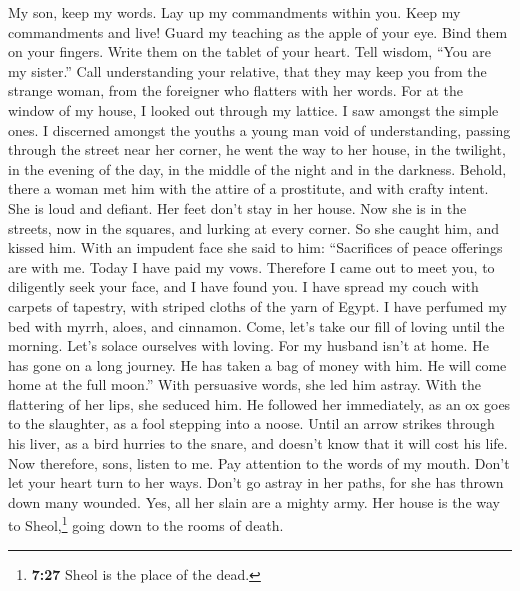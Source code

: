  My son, keep my words. Lay up my commandments within you.
 Keep my commandments and live! Guard my teaching as the
apple of your eye.  Bind them on your fingers. Write them
on the tablet of your heart.  Tell wisdom, ``You are my
sister.'' Call understanding your relative,  that they may
keep you from the strange woman, from the foreigner who flatters with
her words.  For at the window of my house, I looked out
through my lattice.  I saw amongst the simple ones. I
discerned amongst the youths a young man void of understanding,
 passing through the street near her corner, he went the
way to her house,  in the twilight, in the evening of the
day, in the middle of the night and in the darkness. 
Behold, there a woman met him with the attire of a prostitute, and with
crafty intent.  She is loud and defiant. Her feet don't
stay in her house.  Now she is in the streets, now in the
squares, and lurking at every corner.  So she caught him,
and kissed him. With an impudent face she said to him: 
``Sacrifices of peace offerings are with me. Today I have paid my vows.
 Therefore I came out to meet you, to diligently seek
your face, and I have found you.  I have spread my couch
with carpets of tapestry, with striped cloths of the yarn of Egypt.
 I have perfumed my bed with myrrh, aloes, and cinnamon.
 Come, let's take our fill of loving until the morning.
Let's solace ourselves with loving.  For my husband isn't
at home. He has gone on a long journey.  He has taken a
bag of money with him. He will come home at the full moon.''
 With persuasive words, she led him astray. With the
flattering of her lips, she seduced him.  He followed her
immediately, as an ox goes to the slaughter, as a fool stepping into a
noose.  Until an arrow strikes through his liver, as a
bird hurries to the snare, and doesn't know that it will cost his life.
 Now therefore, sons, listen to me. Pay attention to the
words of my mouth.  Don't let your heart turn to her
ways. Don't go astray in her paths,  for she has thrown
down many wounded. Yes, all her slain are a mighty army. 
Her house is the way to Sheol,\footnote{\textbf{7:27} Sheol is the place
  of the dead.} going down to the rooms of death.

